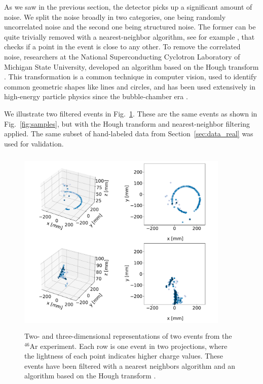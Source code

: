 \documentclass[preprint,12pt]{elsarticle}
\begin{document}
As we saw in the previous section, the detector picks up a significant amount of noise. We split the noise broadly in two categories,  one being randomly uncorrelated noise and the second one being structured noise. The former can be quite trivially removed with a nearest-neighbor algorithm, see for example \cite{hastie2009}, that checks if a point in the event is close to any other. To remove the correlated noise, researchers at the National Superconducting Cyclotron Laboratory of Michigan State University, developed an algorithm based on the Hough transform \cite{Newman1972}. This transformation is a common technique in computer vision, used to identify common geometric shapes like lines and circles, and has been used extensively in high-energy particle physics since the bubble-chamber era \cite{Hough:1959}.  %

We illustrate two filtered events in Fig.~\ref{fig:samples_filtered}. These are the same events as shown in Fig.~\ref{fig:samples}, but with the Hough transform and nearest-neighbor filtering applied. 
The same subset of hand-labeled data from Section~\ref{sec:data_real} was used for validation.

\begin{figure}[ht]
\centering
\includegraphics[width=0.9\textwidth, height=9cm]{custom_work/examples_filtered.pdf}
\caption[Displaying filtered events in 2D and 3D]{Two- and three-dimensional representations of two events from the ${}^{46}$Ar experiment. Each row is one event in two projections, where the lightness of each point indicates higher charge values. These events have been filtered with a nearest neighbors algorithm and an algorithm based on the Hough transform \cite{Newman1972}.}\label{fig:samples_filtered}
\end{figure}
\end{document}
